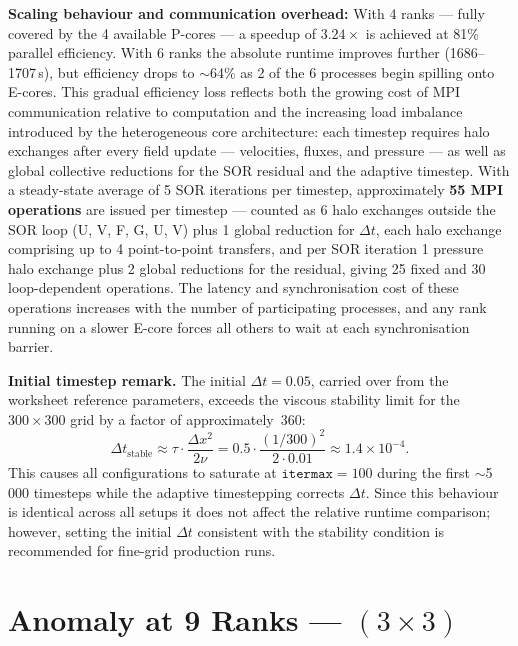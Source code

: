 \documentclass[11pt, a4paper]{article}
\begin{document}
\textbf{Scaling behaviour and communication overhead:} With 4 ranks --- fully
covered by the 4 available P-cores --- a speedup of $3.24\times$ is achieved at
81\% parallel efficiency. With 6 ranks the absolute runtime improves further
(1686--1707\,s), but efficiency drops to $\sim$64\% as 2 of the 6 processes
begin spilling onto E-cores. This gradual efficiency loss reflects both the
growing cost of MPI communication relative to computation and the increasing load
imbalance introduced by the heterogeneous core architecture: each timestep
requires halo exchanges after every field update --- velocities, fluxes, and
pressure --- as well as global collective reductions for the SOR residual and the
adaptive timestep. With a steady-state average of 5 SOR iterations per timestep,
approximately \textbf{55 MPI operations} are issued per timestep --- counted as
6 halo exchanges outside the SOR loop (U, V, F, G, U, V) plus 1 global
reduction for $\Delta t$, each halo exchange comprising up to 4 point-to-point
transfers, and per SOR iteration 1 pressure halo exchange plus 2 global
reductions for the residual, giving 25 fixed and 30 loop-dependent operations.
The latency and synchronisation cost of these operations increases with the
number of participating processes, and any rank running on a slower E-core forces
all others to wait at each synchronisation barrier.

\textbf{Initial timestep remark.} The initial $\Delta t = 0.05$, carried over
from the worksheet reference parameters, exceeds the viscous stability limit for
the $300\times300$ grid by a factor of approximately~360:
\[
    \Delta t_{\mathrm{stable}} \approx \tau \cdot \frac{\Delta x^2}{2\nu}
    = 0.5 \cdot \frac{(1/300)^2}{2 \cdot 0.01} \approx 1.4\times10^{-4}.
\]
This causes all configurations to saturate at $\mathtt{itermax} = 100$ during
the first $\sim$5\,000 timesteps while the adaptive timestepping corrects
$\Delta t$. Since this behaviour is identical across all setups it does not
affect the relative runtime comparison; however, setting the initial $\Delta t$
consistent with the stability condition is recommended for fine-grid production
runs.

\section{Anomaly at 9 Ranks --- \texorpdfstring{$(3\times3)$}{(3x3)}}
\end{document}
